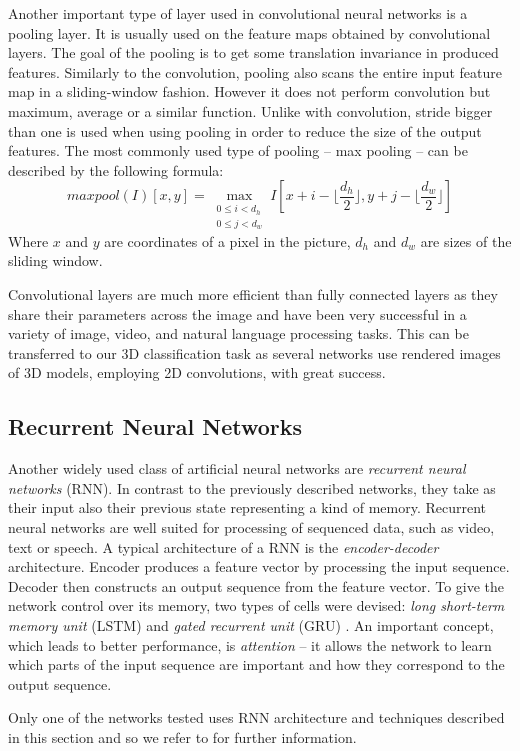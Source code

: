 \par
Another important type of layer used in convolutional neural networks is a pooling layer. It is usually used on the feature maps obtained by convolutional layers. The goal of the pooling is to get some translation invariance in produced features. Similarly to the convolution, pooling also scans the entire input feature map in a sliding-window fashion. However it does not perform convolution but maximum, average or a similar function. Unlike with convolution, stride bigger than one is used when using pooling in order to reduce the size of the output features.
The most commonly used type of pooling -- max pooling -- can be described by the following formula: 
$$maxpool(I)[x,y] =
\max_{\substack{0 \leq i < d_h\\
		0 \leq j < d_w}}
I[x + i - \lfloor \frac{d_h}{2} \rfloor, y + j - \lfloor \frac{d_w}{2}  \rfloor ] $$ Where $x$ and $y$ are coordinates of a pixel in the picture, $d_h$ and $d_w$ are sizes of the sliding window.\par
Convolutional layers are much more efficient than fully connected layers as they share their parameters across the image and have been very successful in a variety of image, video, and natural language processing tasks. This  can be transferred to our 3D classification task as several networks use rendered images of 3D models, employing 2D convolutions, with great success.

\subsection{Recurrent Neural Networks}
Another widely used class of artificial neural networks are \textit{recurrent neural networks} (RNN). In contrast to the previously described networks, they take as their input also their previous state representing a kind of memory. Recurrent neural networks are well suited for processing of sequenced data, such as video, text or speech. A typical architecture of a RNN is the \textit{encoder-decoder} architecture. Encoder produces a feature vector by processing the input sequence. Decoder then constructs an output sequence from the feature vector. To give the network control over its memory, two types of cells were devised: \textit{long short-term memory unit} (LSTM) \cite{hochreiter_long_1997} and \textit{gated recurrent unit} (GRU) \cite{cho_learning_2014}. An important concept, which leads to better performance, is \textit{attention} \cite{bahdanau_neural_2014} -- it allows the network to learn which parts of the input sequence are important and how they correspond to the output sequence.\par
Only one of the networks tested uses RNN architecture and techniques described in this section and  so we refer to \cite{goodfellow_deep_2016} for further information. 

